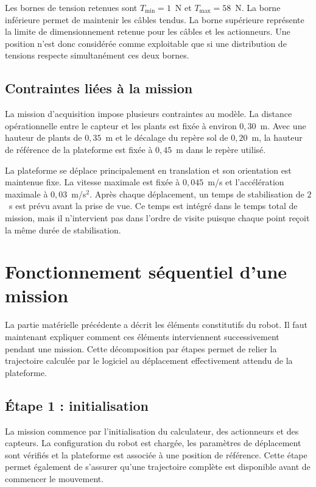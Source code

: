 Les bornes de tension retenues sont $T_{\min}=1$~N et $T_{\max}=58$~N. La borne inférieure permet de maintenir les câbles tendus. La borne supérieure représente la limite de dimensionnement retenue pour les câbles et les actionneurs. Une position n'est donc considérée comme exploitable que si une distribution de tensions respecte simultanément ces deux bornes.

\subsection{Contraintes liées à la mission}

La mission d'acquisition impose plusieurs contraintes au modèle. La distance opérationnelle entre le capteur et les plants est fixée à environ $0{,}30$~m. Avec une hauteur de plants de $0{,}35$~m et le décalage du repère sol de $0{,}20$~m, la hauteur de référence de la plateforme est fixée à $0{,}45$~m dans le repère utilisé.

La plateforme se déplace principalement en translation et son orientation est maintenue fixe. La vitesse maximale est fixée à $0{,}045$~m/s et l'accélération maximale à $0{,}03$~m/s$^2$. Après chaque déplacement, un temps de stabilisation de $2$~s est prévu avant la prise de vue. Ce temps est intégré dans le temps total de mission, mais il n'intervient pas dans l'ordre de visite puisque chaque point reçoit la même durée de stabilisation.

\section{Fonctionnement séquentiel d'une mission}
\label{sec:fonctionnement_sequentiel}

La partie matérielle précédente a décrit les éléments constitutifs du robot. Il faut maintenant expliquer comment ces éléments interviennent successivement pendant une mission. Cette décomposition par étapes permet de relier la trajectoire calculée par le logiciel au déplacement effectivement attendu de la plateforme.

\subsection{Étape 1 : initialisation}

La mission commence par l'initialisation du calculateur, des actionneurs et des capteurs. La configuration du robot est chargée, les paramètres de déplacement sont vérifiés et la plateforme est associée à une position de référence. Cette étape permet également de s'assurer qu'une trajectoire complète est disponible avant de commencer le mouvement.

